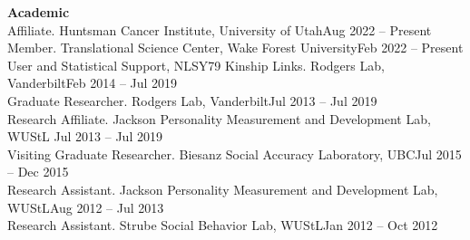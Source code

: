 
\large{\textbf{Academic}}\\
Affiliate. Huntsman Cancer Institute, University of Utah\hfill{Aug 2022 – Present}\\
Member. Translational Science Center, Wake Forest University\hfill{Feb 2022 – Present}\\
User and Statistical Support, NLSY79 Kinship Links. Rodgers Lab, Vanderbilt\hfill{Feb 2014 – Jul 2019}\\
Graduate Researcher. Rodgers Lab, Vanderbilt\hfill{Jul 2013 – Jul 2019}\\
Research Affiliate. Jackson Personality Measurement and Development Lab, WUStL \hfill{Jul 2013 – Jul 2019}\\
Visiting Graduate Researcher. Biesanz Social Accuracy Laboratory, UBC\hfill{Jul 2015 – Dec 2015}\\
Research Assistant. Jackson Personality Measurement and Development Lab, WUStL\hfill{Aug 2012 – Jul 2013}\\
Research Assistant. Strube Social Behavior Lab, WUStL\hfill{Jan 2012 – Oct 2012}
